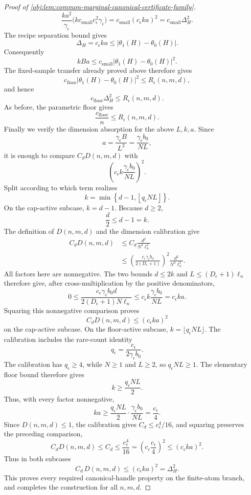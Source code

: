\documentclass[11pt]{article}
\begin{document}
\begin{proof}[Proof of \cref{obj:lem:common-marginal-canonical-certificate-family}]
\[\frac{k a^2}{\gamma_\epsilon}
\bigl(kc_{\mathrm{small}}c_\epsilon^2\gamma_\epsilon\bigr)
=
c_{\mathrm{small}}(c_\epsilon ka)^2
=
c_{\mathrm{small}}\Delta_H^2.
\]
The recipe separation bound gives
\[
\Delta_H=c_\epsilon ka
\le
\left|\theta_1(H)-\theta_0(H)\right|.
\]
Consequently
\[
kBa
\le
c_{\mathrm{small}}
\left|\theta_1(H)-\theta_0(H)\right|^2 .
\]
The fixed-sample transfer already proved above therefore gives
\[
c_{\mathrm{floor}}
\left|\theta_1(H)-\theta_0(H)\right|^2
\le
R_\epsilon(n,m,d),
\]
and hence
\[
c_{\mathrm{floor}}\Delta_H^2\le R_\epsilon(n,m,d).
\]
As before, the parametric floor gives
\[
\frac{c_{\mathrm{floor}}}{n}\le R_\epsilon(n,m,d).
\]
Finally we verify the dimension absorption for the above \(L,k,a\).  Since
\[
a=\frac{\gamma_\epsilon B}{L^2}
=\frac{\gamma_\epsilon b_0}{NL},
\]
it is enough to compare \(C_dD(n,m,d)\) with
\[
\left(c_\epsilon k\frac{\gamma_\epsilon b_0}{NL}\right)^2.
\]
Split according to which term realizes
\[
k=\min\left\{d-1,\left\lfloor q_\epsilon NL\right\rfloor\right\}.
\]
On the cap-active subcase, \(k=d-1\).  Because \(d\ge2\),
\[
\frac d2\le d-1=k.
\]
The definition of \(D(n,m,d)\) and the dimension calibration give
\[
\begin{aligned}
C_dD(n,m,d)
&\le C_d\frac{d^2}{N^2\ell_n^2} \\
&\le
\left(\frac{c_\epsilon\gamma_\epsilon b_0}{2(D_\epsilon+1)}\right)^2
\frac{d^2}{N^2\ell_n^2}.
\end{aligned}
\]
All factors here are nonnegative.  The two bounds
\(d\le2k\) and \(L\le(D_\epsilon+1)\ell_n\) therefore give, after
cross-multiplication by the positive denominators,
\[
0\le
\frac{c_\epsilon\gamma_\epsilon b_0d}
     {2(D_\epsilon+1)N\ell_n}
\le
c_\epsilon k\frac{\gamma_\epsilon b_0}{NL}
=c_\epsilon ka.
\]
Squaring this nonnegative comparison proves
\[
C_dD(n,m,d)\le(c_\epsilon ka)^2
\]
on the cap-active subcase.
On the floor-active subcase, \(k=\lfloor q_\epsilon NL\rfloor\).  The calibration includes the rare-count identity
\[
q_\epsilon=\frac{c_\epsilon}{2\gamma_\epsilon b_0}.
\]
The calibration has \(q_\epsilon\ge4\), while \(N\ge1\) and \(L\ge2\), so
\(q_\epsilon NL\ge1\).  The elementary floor bound therefore gives
\[
k\ge \frac{q_\epsilon NL}{2}.
\]
Thus, with every factor nonnegative,
\[
ka
\ge
\frac{q_\epsilon NL}{2}\cdot\frac{\gamma_\epsilon b_0}{NL}
=\frac{c_\epsilon}{4}.
\]
Since \(D(n,m,d)\le1\), the calibration gives
\(C_d\le c_\epsilon^4/16\), and squaring preserves the preceding comparison,
\[
C_dD(n,m,d)
\le C_d
\le \frac{c_\epsilon^4}{16}
=\left(c_\epsilon\frac{c_\epsilon}{4}\right)^2
\le (c_\epsilon ka)^2.
\]
Thus in both subcases
\[
C_d\,D(n,m,d)\le (c_\epsilon ka)^2=\Delta_H^2.
\] %
This proves every required canonical-handle property on the finite-atom branch, and completes the construction for all \(n,m,d\). %
\end{proof}
\end{document}
